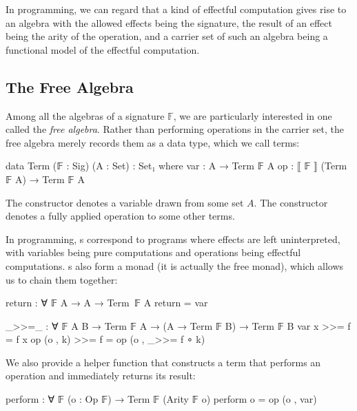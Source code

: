 In programming, we can regard that a kind of effectful computation gives rise to an algebra with the allowed effects being the signature, the result of an effect being the arity of the operation, and a carrier set of such an algebra being a functional model of the effectful computation.

\subsection{The Free Algebra}

Among all the algebras of a signature $\mathbb{F}$, we are particularly interested in one called the \emph{free algebra}.
%
Rather than performing operations in the carrier set, the free algebra merely records them as a data type, which we call terms:
%
\begin{center}\begin{code}
data Term (𝔽 : Sig) (A : Set) : Set₁ where
  var : A → Term 𝔽 A
  op : ⟦ 𝔽 ⟧ (Term 𝔽 A) → Term 𝔽 A
\end{code}\end{center}
%
The  constructor denotes a variable drawn from some set $A$.
%
The  constructor denotes a fully applied operation to some other terms.
%

In programming, s correspond to programs where effects are left uninterpreted, with variables being pure computations and operations being effectful computations.
%
s also form a monad (it is actually the free monad), which allows us to chain them together:
%
\begin{center}\begin{code}
return : ∀ {𝔽} {A} → A → Term 𝔽 A
return = var

_>>=_ : ∀ {𝔽} {A B} → Term 𝔽 A → (A → Term 𝔽 B) → Term 𝔽 B
var x       >>= f =  f x
op (o , k)  >>= f =  op (o , _>>= f ∘ k)
\end{code}\end{center}
%
We also provide a helper function that constructs a term that performs an operation and immediately returns its result:
%
\begin{center}\begin{code}
perform : ∀ {𝔽} (o : Op 𝔽) → Term 𝔽 (Arity 𝔽 o)
perform o = op (o , var)
\end{code}\end{center}

